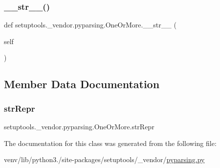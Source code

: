\subsubsection{\texorpdfstring{\+\_\+\+\_\+str\+\_\+\+\_\+()}{\_\_str\_\_()}}
{\footnotesize\ttfamily def setuptools.\+\_\+vendor.\+pyparsing.\+One\+Or\+More.\+\_\+\+\_\+str\+\_\+\+\_\+ (\begin{DoxyParamCaption}\item[{}]{self }\end{DoxyParamCaption})}



\subsection{Member Data Documentation}
\mbox{\label{classsetuptools_1_1__vendor_1_1pyparsing_1_1OneOrMore_a883dd01ccfe60d6fdab612eeb2e3eb9c}} 
\subsubsection{\texorpdfstring{str\+Repr}{strRepr}}
{\footnotesize\ttfamily setuptools.\+\_\+vendor.\+pyparsing.\+One\+Or\+More.\+str\+Repr}



The documentation for this class was generated from the following file\+:\begin{DoxyCompactItemize}
\item 
venv/lib/python3./site-\/packages/setuptools/\+\_\+vendor/\hyperlink{setuptools_2__vendor_2pyparsing_8py}{pyparsing.\+py}\end{DoxyCompactItemize}
